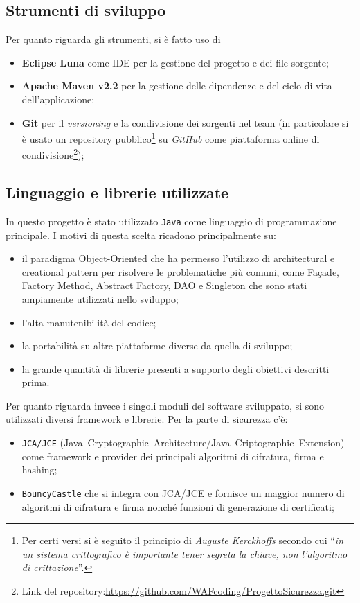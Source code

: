 \subsection{Strumenti di sviluppo}
Per quanto riguarda gli strumenti, si è fatto uso di
\begin{itemize}
		\item \textbf{Eclipse Luna} come IDE per la gestione del progetto e dei file sorgente;
		\item \textbf{Apache Maven v2.2} per la gestione delle dipendenze e del ciclo di vita dell'applicazione;
		\item \textbf{Git} per il \emph{versioning} e la condivisione dei sorgenti nel team (in particolare si è usato un repository pubblico\footnote{Per certi versi si è seguito il principio di \emph{Auguste Kerckhoffs} secondo cui ``\emph{in un sistema crittografico è importante tener segreta la chiave, non l'algoritmo di crittazione}''.} su \emph{GitHub} come piattaforma online di condivisione\footnote{Link del repository:\url{https://github.com/WAFcoding/ProgettoSicurezza.git}});
\end{itemize}

\subsection{Linguaggio e librerie utilizzate}
In questo progetto è stato utilizzato \texttt{Java} come linguaggio di programmazione principale. I motivi di questa scelta ricadono principalmente su:
\begin{itemize}
	\item il paradigma Object-Oriented che ha permesso l'utilizzo di architectural e creational pattern  per risolvere le problematiche più comuni, come Façade, Factory Method, Abstract Factory, DAO e Singleton che sono stati ampiamente utilizzati nello sviluppo;
	\item l'alta manutenibilità del codice;
	\item la portabilità su altre piattaforme diverse da quella di sviluppo;
	\item la grande quantità di librerie presenti a supporto degli obiettivi descritti prima.
\end{itemize}

Per quanto riguarda invece i singoli moduli del software sviluppato, si sono utilizzati diversi framework e librerie.
Per la parte di sicurezza c'è:
\begin{itemize}
	\item \texttt{JCA/JCE} (Java~Cryptographic~Architecture/Java~Criptographic~Extension) come framework e provider dei principali algoritmi di cifratura, firma e hashing;
	\item \texttt{BouncyCastle} che si integra con JCA/JCE  e fornisce un maggior numero di algoritmi di cifratura e firma nonché funzioni di generazione di certificati; 
\end{itemize}

